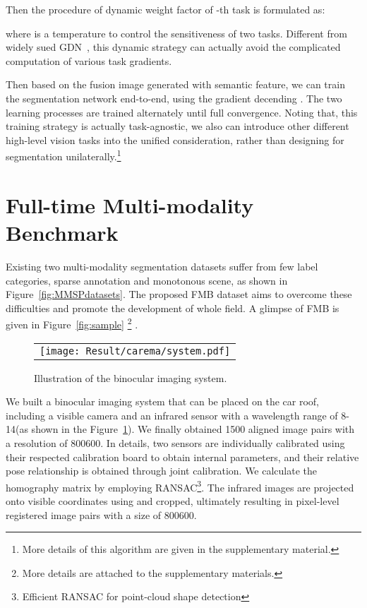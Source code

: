 \documentclass[10pt,twocolumn,letterpaper]{article}
\begin{document}
Then the procedure of  dynamic weight factor of -th task is formulated as:

where  is a temperature to control the sensitiveness of two tasks. Different from widely sued GDN~\cite{chen2018gradnorm}, this dynamic strategy can  actually avoid the complicated computation of various task gradients. 

Then based on the fusion image generated with semantic feature, we can train the segmentation network end-to-end, using the gradient decending . The two learning processes are trained alternately until full convergence.
Noting that, this training strategy is actually task-agnostic, we also can introduce other different  high-level vision tasks into the unified consideration, rather than designing for segmentation unilaterally.\footnote{More details of this algorithm  are given in the supplementary material.} 


\section{Full-time Multi-modality Benchmark}
Existing two multi-modality segmentation datasets suffer from few label categories, sparse annotation and monotonous scene, as shown in Figure~\ref{fig:MMSPdatasets}. The proposed FMB dataset aims to overcome these difficulties and promote the development of  whole field. A glimpse of FMB is given in Figure~\ref{fig:sample} \footnote{More details  are attached to the supplementary materials.} .

\begin{figure}[!htb]
	\centering
	\setlength{\tabcolsep}{1pt}
	\begin{tabular}{c}
		
		\texttt{[image: Result/carema/system.pdf]}
		\\ 				
	\end{tabular}
	\caption{Illustration of the binocular imaging system.}
	\label{fig:SYSTEM}
\end{figure}

We built a binocular imaging system that can be placed on the car roof, including a visible camera and an infrared sensor with a wavelength range of 8-14(as shown in the Figure~\ref{fig:SYSTEM}). We finally obtained 1500 aligned image pairs with a resolution of 800600. In details, two sensors are individually calibrated using their respected calibration board to obtain internal parameters, and their relative pose relationship is obtained through joint calibration. We calculate the homography matrix  by employing RANSAC\footnote{Efficient RANSAC for point‐cloud shape detection}. The infrared images are projected onto visible coordinates using  and cropped, ultimately resulting in pixel-level registered image pairs with a size of 800600. 
\end{document}

